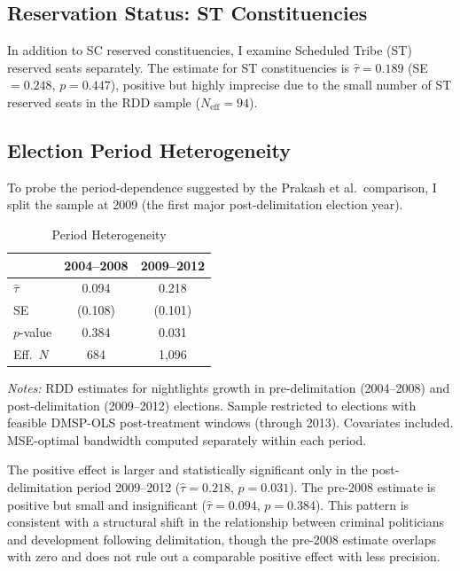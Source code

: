 \documentclass[12pt]{article}
\begin{document}
\subsection{Reservation Status: ST Constituencies}

In addition to SC reserved constituencies, I examine Scheduled Tribe (ST) reserved seats separately. The estimate for ST constituencies is $\hat{\tau} = 0.189$ (SE $= 0.248$, $p = 0.447$), positive but highly imprecise due to the small number of ST reserved seats in the RDD sample ($N_{\text{eff}} = 94$).

\subsection{Election Period Heterogeneity}

To probe the period-dependence suggested by the Prakash et al.\ comparison, I split the sample at 2009 (the first major post-delimitation election year).

\begin{table}[H]
\centering
\caption{Period Heterogeneity}
\label{tab:period}
\begin{threeparttable}
\begin{tabular}{lcc}
\toprule
 & 2004--2008 & 2009--2012 \\
\midrule
$\hat{\tau}$ & 0.094 & 0.218 \\
SE & (0.108) & (0.101) \\
$p$-value & 0.384 & 0.031 \\
Eff.\ $N$ & 684 & 1,096 \\
\bottomrule
\end{tabular}
\begin{tablenotes}[flushleft]
\small
\item \textit{Notes:} RDD estimates for nightlights growth in pre-delimitation (2004--2008) and post-delimitation (2009--2012) elections. Sample restricted to elections with feasible DMSP-OLS post-treatment windows (through 2013). Covariates included. MSE-optimal bandwidth computed separately within each period.
\end{tablenotes}
\end{threeparttable}
\end{table}

The positive effect is larger and statistically significant only in the post-delimitation period 2009--2012 ($\hat{\tau} = 0.218$, $p = 0.031$). The pre-2008 estimate is positive but small and insignificant ($\hat{\tau} = 0.094$, $p = 0.384$). This pattern is consistent with a structural shift in the relationship between criminal politicians and development following delimitation, though the pre-2008 estimate overlaps with zero and does not rule out a comparable positive effect with less precision.
\end{document}
